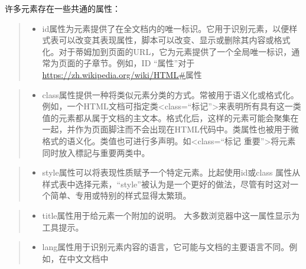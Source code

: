 \documentclass[
]{article}
\providecommand{\tightlist}{%
  \setlength{\itemsep}{0pt}\setlength{\parskip}{0pt}}
\begin{document}
许多元素存在一些共通的属性：

\begin{quote}
\begin{itemize}
\tightlist
\item
  id属性为元素提供了在全文档内的唯一标识。它用于识别元素，以便样式表可以改变其表现属性，脚本可以改变、显示或删除其内容或格式化。对于蒂姆加到页面的URL，它为元素提供了一个全局唯一标识，通常为页面的子章节。例如，ID
  ``属性''对于\url{https://zh.wikipedia.org/wiki/HTML\#}属性
\end{itemize}
\end{quote}

\begin{quote}
\begin{itemize}
\tightlist
\item
  class属性提供一种将类似元素分类的方式。常被用于语义化或格式化。例如，一个HTML文档可指定类\textless class=``标记''\textgreater 来表明所有具有这一类值的元素都从属于文档的主文本。格式化后，这样的元素可能会聚集在一起，并作为页面脚注而不会出现在HTML代码中。类属性也被用于微格式的语义化。类值也可进行多声明。如\textless class=``标记
  重要''\textgreater 将元素同时放入標記与重要两类中。
\end{itemize}
\end{quote}

\begin{quote}
\begin{itemize}
\tightlist
\item
  style属性可以将表现性质赋予一个特定元素。比起使用id或class
  属性从样式表中选择元素，``style''被认为是一个更好的做法，尽管有时这对一个简单、专用或特别的样式显得太繁琐。
\end{itemize}
\end{quote}

\begin{quote}
\begin{itemize}
\tightlist
\item
  title属性用于给元素一个附加的说明。
  大多数浏览器中这一属性显示为工具提示。
\end{itemize}
\end{quote}

\begin{quote}
\begin{itemize}
\tightlist
\item
  lang属性用于识别元素内容的语言，它可能与文档的主要语言不同。例如，在中文文档中
\end{itemize}
\end{quote}
\end{document}
